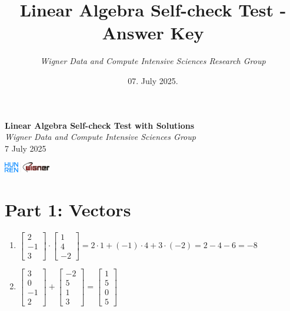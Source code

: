\documentclass{article}
\title{Linear Algebra Self-check Test - Answer Key}
\date{07. July 2025.}
\author{\textit{Wigner Data and Compute Intensive Sciences Research Group}}
\begin{document}
\begin{minipage}{0.8\textwidth}
	\centering
	{\Large\textbf{Linear Algebra Self-check Test with Solutions}\\ \textit{Wigner Data and Compute Intensive Sciences Group}}\\
	\vspace*{0.25cm}
	{\normalsize 7 July 2025}
\end{minipage}
\begin{minipage}{0.2\textwidth}
	\includegraphics[width=2cm]{../img/logo.png}
\end{minipage}

\vspace{0.75cm}

\section*{Part 1: Vectors}
\begin{enumerate}
\item $\begin{bmatrix} 2 \\ -1 \\ 3 \end{bmatrix} \cdot \begin{bmatrix} 1 \\ 4 \\ -2 \end{bmatrix} = \boxed{2\cdot1 + (-1)\cdot4 + 3\cdot(-2) = 2 - 4 - 6 = -8}$

\item $\begin{bmatrix} 3 \\ 0 \\ -1 \\ 2 \end{bmatrix} + \begin{bmatrix} -2 \\ 5 \\ 1 \\ 3 \end{bmatrix} = \boxed{\begin{bmatrix} 1 \\ 5 \\ 0 \\ 5 \end{bmatrix}}$ \\ 
\end{enumerate}
\end{document}
